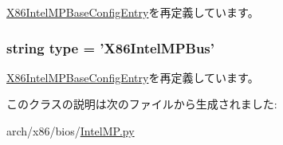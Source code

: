 \hyperlink{classIntelMP_1_1X86IntelMPBaseConfigEntry_a17da7064bc5c518791f0c891eff05fda}{X86IntelMPBaseConfigEntry}を再定義しています。\hypertarget{classIntelMP_1_1X86IntelMPBus_acce15679d830831b0bbe8ebc2a60b2ca}{
\subsubsection[{type}]{\setlength{\rightskip}{0pt plus 5cm}string {\bf type} = '{\bf X86IntelMPBus}'}}
\label{classIntelMP_1_1X86IntelMPBus_acce15679d830831b0bbe8ebc2a60b2ca}


\hyperlink{classIntelMP_1_1X86IntelMPBaseConfigEntry_acce15679d830831b0bbe8ebc2a60b2ca}{X86IntelMPBaseConfigEntry}を再定義しています。

このクラスの説明は次のファイルから生成されました:\begin{DoxyCompactItemize}
\item 
arch/x86/bios/\hyperlink{IntelMP_8py}{IntelMP.py}\end{DoxyCompactItemize}
